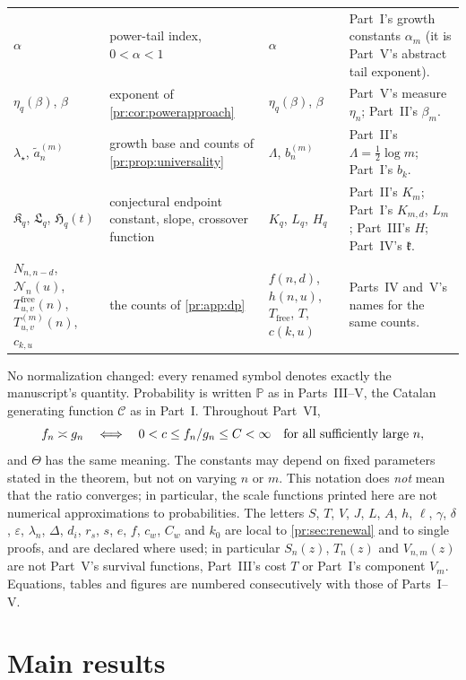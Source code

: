 \documentclass[11pt,a4paper]{article}
\theoremstyle{definition}\newaliascnt{definition}{theorem}
\theoremstyle{remark}\newaliascnt{remark}{theorem}
\newcommand{\Cat}{\mathcal C}
\newcommand{\ljP}{\mathbb P}
\begin{document}
\begin{table}[htbp]
\begin{tabular}{>{\raggedright}p{.19\linewidth}>{\raggedright}p{.29\linewidth}>{\raggedright}p{.12\linewidth}>{\raggedright\arraybackslash}p{.28\linewidth}}
$\alpha$ & power-tail index, $0<\alpha<1$ & $\alpha$ & Part~I's growth
 constants $\alpha_m$ (it is Part~V's abstract tail exponent).\\
$\eta_q(\beta)$, $\beta$ & exponent of \cref{pr:cor:powerapproach} &
 $\eta_q(\beta)$, $\beta$ & Part~V's measure $\eta_n$; Part~II's
 $\beta_m$.\\
$\lambda_\star$, $\tilde a^{(m)}_n$ & growth base and counts of
 \cref{pr:prop:universality} & $\Lambda$, $b^{(m)}_n$ & Part~II's
 $\Lambda=\frac12\log m$; Part~I's $b_k$.\\
$\mathfrak K_q$, $\mathfrak L_q$, $\mathfrak H_q(t)$ & conjectural endpoint
 constant, slope, crossover function & $K_q$, $L_q$, $H_q$ & Part~II's $K_m$;
 Part~I's $K_{m,d}$, $L_m$; Part~III's $H$; Part~IV's $\mathfrak k$.\\
$N_{n,n-d}$, $\mathcal N_n(u)$, $T^{\mathrm{free}}_{u,v}(n)$,
 $T^{(m)}_{u,v}(n)$, $c_{k,u}$ & the counts of \cref{pr:app:dp} &
 $f(n,d)$, $h(n,u)$, $T_{\mathrm{free}}$, $T$, $c(k,u)$ & Parts~IV and~V's
 names for the same counts.\\
\bottomrule
\end{tabular}
\end{table}

No normalization changed: every renamed symbol denotes exactly the
manuscript's quantity. Probability is written $\ljP$ as in Parts~III--V,
the Catalan generating function $\Cat$ as in Part~I. Throughout Part~VI,
\[
 f_n\asymp g_n
 \quad\Longleftrightarrow\quad
 0<c\le f_n/g_n\le C<\infty
 \quad\hbox{for all sufficiently large }n,
\]
and $\Theta$ has the same meaning. The constants may depend on fixed
parameters stated in the theorem, but not on varying $n$ or $m$. This
notation does \emph{not} mean that the ratio converges; in particular, the
scale functions printed here are not numerical approximations to
probabilities. The letters $S$, $T$, $V$, $J$, $L$, $A$, $h$, $\ell$,
$\gamma$, $\delta$, $\varepsilon$, $\lambda_n$, $\Delta$, $d_i$, $r_s$, $s$,
$e$, $f$, $c_w$, $C_w$ and $k_0$ are local to \cref{pr:sec:renewal} and to
single proofs, and are declared where used; in particular $S_n(z)$,
$T_n(z)$ and $V_{n,m}(z)$ are not Part~V's survival functions, Part~III's
cost $T$ or Part~I's component $V_m$. Equations, tables and figures are
numbered consecutively with those of Parts~I--V.

\section{Main results}
\label{pr:sec:main}
\end{document}
